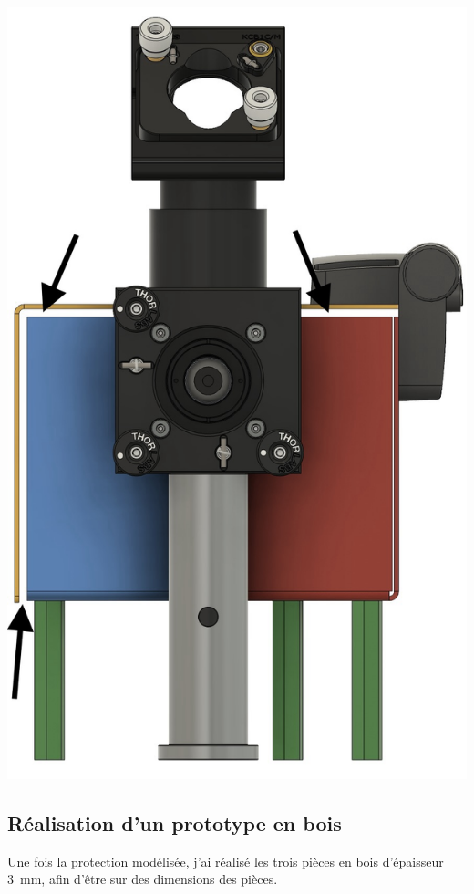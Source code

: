 \begin{minipage}[c]{0.38\textwidth}
    \begin{center}
        \includegraphics[width=\textwidth]{assets/figures/Protections_laser/Securite_mecanique/Protection_entree_laser/contrainte_passage_laser_capot.jpeg}
    \end{center}
    \label{contrainte_passage_laser_capot}
\end{minipage}

\subsection{Réalisation d'un prototype en bois} \label{prototype_bois}
Une fois la protection modélisée, j'ai réalisé les trois pièces en bois d'épaisseur 3~mm, afin d'être sur des dimensions des pièces.

